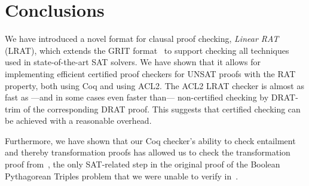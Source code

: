 \documentclass{article}
\begin{document}
%
\section{Conclusions}
\label{sec:conclusion}

We have introduced a novel format for clausal proof checking, \emph{Linear RAT} (LRAT), 
which extends the GRIT format~\cite{grit} to support checking all techniques used in state-of-the-art SAT solvers.
We have shown that it allows for implementing efficient certified proof checkers for UNSAT proofs with the RAT property,
both using Coq and using ACL2. The ACL2 LRAT checker is almost as fast as ---and in some cases even faster than---
non-certified checking by DRAT-trim of the corresponding DRAT proof. This suggests that certified checking can
be achieved with a reasonable overhead. 

Furthermore, we have shown that our Coq checker's ability to check entailment and thereby transformation proofs has allowed us
to check the transformation proof from~\cite{heule-sat16a}, the
only SAT-related step in the original proof of the Boolean Pythagorean Triples problem that we were unable to verify
in~\cite{grit}.

\newpage



\end{document}
